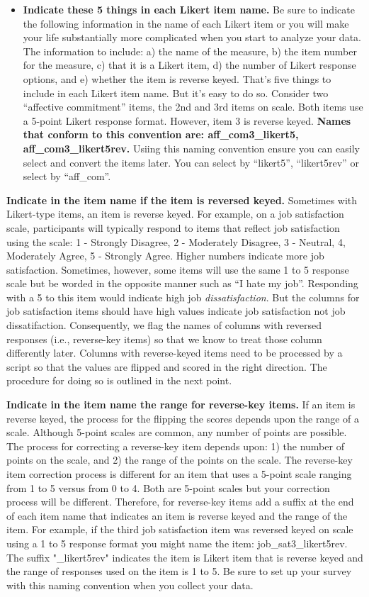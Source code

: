 \documentclass[
]{krantz}
\begin{document}
\begin{itemize}
\item
  \textbf{Indicate these 5 things in each Likert item name.} Be sure to indicate the following information in the name of each Likert item or you will make your life substantially more complicated when you start to analyze your data. The information to include: a) the name of the measure, b) the item number for the measure, c) that it is a Likert item, d) the number of Likert response options, and e) whether the item is reverse keyed. That's five things to include in each Likert item name. But it's easy to do so. Consider two ``affective commitment'' items, the 2nd and 3rd items on scale. Both items use a 5-point Likert response format. However, item 3 is reverse keyed. \textbf{Names that conform to this convention are: aff\_com3\_likert5, aff\_com3\_likert5rev.} Usiing this naming convention ensure you can easily select and convert the items later. You can select by ``likert5'', ``likert5rev'' or select by ``aff\_com''.
\end{itemize}

\textbf{Indicate in the item name if the item is reversed keyed. } Sometimes with Likert-type items, an item is reverse keyed. For example, on a job satisfaction scale, participants will typically respond to items that reflect job satisfaction using the scale: 1 - Strongly Disagree, 2 - Moderately Disagree, 3 - Neutral, 4, Moderately Agree, 5 - Strongly Agree. Higher numbers indicate more job satisfaction. Sometimes, however, some items will use the same 1 to 5 response scale but be worded in the opposite manner such as ``I hate my job''. Responding with a 5 to this item would indicate high job \emph{dissatisfaction}. But the columns for job satisfaction items should have high values indicate job satisfaction not job dissatifaction. Consequently, we flag the names of columns with reversed responses (i.e., reverse-key items) so that we know to treat those column differently later. Columns with reverse-keyed items need to be processed by a script so that the values are flipped and scored in the right direction. The procedure for doing so is outlined in the next point.

\textbf{Indicate in the item name the range for reverse-key items.} If an item is reverse keyed, the process for the flipping the scores depends upon the range of a scale. Although 5-point scales are common, any number of points are possible. The process for correcting a reverse-key item depends upon: 1) the number of points on the scale, and 2) the range of the points on the scale. The reverse-key item correction process is different for an item that uses a 5-point scale ranging from 1 to 5 versus from 0 to 4. Both are 5-point scales but your correction process will be different. Therefore, for reverse-key items add a suffix at the end of each item name that indicates an item is reverse keyed and the range of the item. For example, if the third job satisfaction item was reversed keyed on scale using a 1 to 5 response format you might name the item: job\_sat3\_likert5rev. The suffix "\_likert5rev" indicates the item is Likert item that is reverse keyed and the range of responses used on the item is 1 to 5. Be sure to set up your survey with this naming convention when you collect your data.
\end{document}
